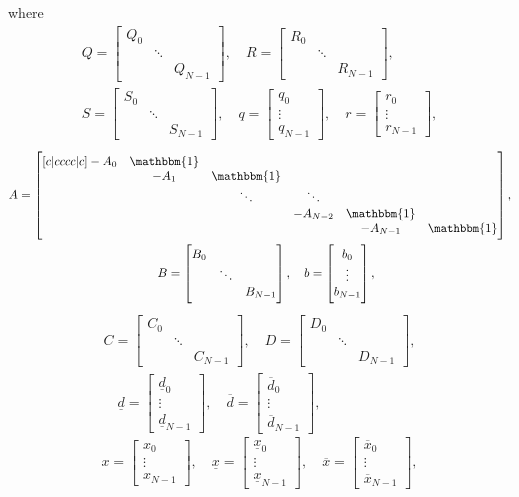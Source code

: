 \documentclass[a4paper]{article}
\newcommand{\I}{\mathbbm{1}}
\newcommand{\bbmat}{\begin{bmatrix}}
\newcommand{\ebmat}{\end{bmatrix}}
\begin{document}
where
\begin{multline}
	Q = \bbmat Q_0 \\ & \ddots \\ && Q_{N-1} \ebmat,
	\quad R = \bbmat R_0 \\ & \ddots \\ && R_{N-1} \ebmat,\\
	S = \bbmat S_0 \\ & \ddots \\ && S_{N-1} \ebmat,
	\quad q = \bbmat q_0 \\ \vdots \\ q_{N-1} \ebmat,
	\quad r = \bbmat r_0 \\ \vdots \\ r_{N-1} \ebmat,
\end{multline}
\begin{multline}
	A = \begin{bmatrix}[c|cccc|c]
		-A_0 & \I & & & & \\
		& -A_1 & \I & & & \\
		& & \ddots & \ddots & & \\
		& & & -A_{N-2} & \I & \\
		& & & & -A_{N-1} & \I
	\end{bmatrix},\\
	\quad B = \bbmat B_0 \\ & \ddots \\ && B_{N-1} \ebmat,
	\quad b = \bbmat b_0 \\ \vdots \\ b_{N-1} \ebmat,
\end{multline}
\begin{multline}
	C = \bbmat C_0 \\ & \ddots \\ && C_{N-1} \ebmat,
	\quad D = \bbmat D_0 \\ & \ddots \\ && D_{N-1} \ebmat,\\
	\quad \underline{d} = \bbmat \underline{d}_0 \\ \vdots \\ \underline{d}_{N-1} \ebmat,
	\quad \overline{d} = \bbmat \overline{d}_0 \\ \vdots \\ \overline{d}_{N-1} \ebmat,
\end{multline}
\begin{equation}
	x = \bbmat x_0 \\ \vdots \\ x_{N-1} \ebmat,
	\quad \underline{x} = \bbmat \underline{x}_0 \\ \vdots \\ \underline{x}_{N-1} \ebmat,
	\quad \overline{x} = \bbmat \overline{x}_0 \\ \vdots \\ \overline{x}_{N-1} \ebmat,
\end{equation}
\end{document}
